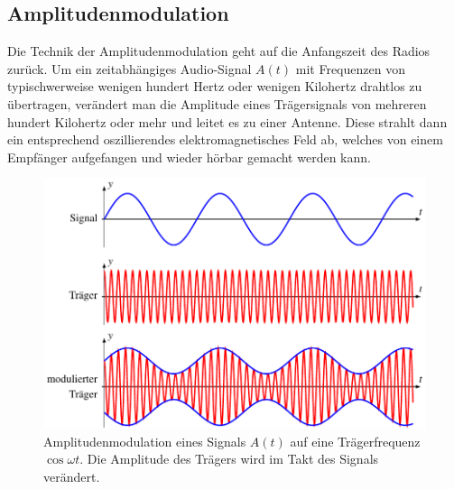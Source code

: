 %
%
%
\subsection{Amplitudenmodulation
\label{subsection:amplitudenmodulation}}
Die Technik der Amplitudenmodulation geht auf die Anfangszeit des
Radios zurück.
Um ein zeitabhängiges Audio-Signal $A(t)$ mit Frequenzen von typischwerweise
wenigen hundert Hertz oder wenigen Kilohertz drahtlos zu übertragen,
verändert man die Amplitude eines Trägersignals von mehreren hundert
Kilohertz oder mehr und leitet es zu einer Antenne.
Diese strahlt dann ein entsprechend oszillierendes elektromagnetisches
Feld ab, welches von einem Empfänger aufgefangen und wieder hörbar gemacht
werden kann.

\begin{figure}
\centering
\includegraphics{applications/qam/images/am.pdf}
\caption{Amplitudenmodulation eines Signals $A(t)$ auf eine
Trägerfrequenz $\cos\omega t$.
Die Amplitude des Trägers wird im Takt des Signals verändert.
\label{figure:qam:am}}
\end{figure}

